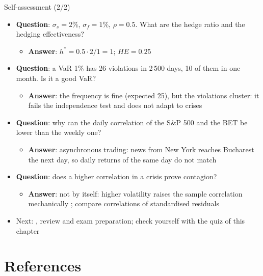 \begin{frame}{Self-assessment (2/2)}
\itemsize{\footnotesize}
\begin{itemize}
    \item \textbf{Question}: $\sigma_s = 2\%$, $\sigma_f = 1\%$, $\rho = 0.5$. What are the hedge ratio and the hedging effectiveness?
    \begin{itemize}
        \item \textbf{Answer}: $h^* = 0.5 \cdot 2/1 = 1$; $HE = 0.25$
    \end{itemize}
    \item \textbf{Question}: a VaR 1\% has 26 violations in 2\,500 days, 10 of them in one month. Is it a good VaR?
    \begin{itemize}
        \item \textbf{Answer}: the frequency is fine (expected 25), but the violations cluster: it fails the independence test and does not adapt to crises
    \end{itemize}
    \item \textbf{Question}: why can the daily correlation of the S\&P 500 and the BET be lower than the weekly one?
    \begin{itemize}
        \item \textbf{Answer}: asynchronous trading: news from New York reaches Bucharest the next day, so daily returns of the same day do not match
    \end{itemize}
    \item \textbf{Question}: does a higher correlation in a crisis prove contagion?
    \begin{itemize}
        \item \textbf{Answer}: not by itself: higher volatility raises the sample correlation mechanically ; compare correlations of standardised residuals
    \end{itemize}
    \item Next: , review and exam preparation; check yourself with the quiz of this chapter
\end{itemize}
\end{frame}


\section{References}

